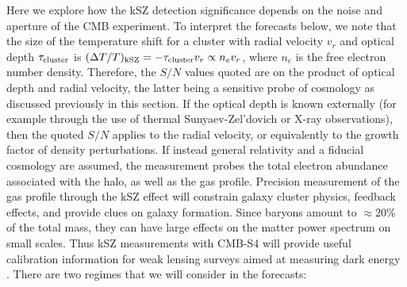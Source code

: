 Here we explore how the kSZ detection significance depends on the noise and aperture of the CMB experiment. 
To interpret the forecasts below, we note that the size of the temperature shift for a cluster with radial velocity $v_r$ and optical depth $\tau_{\rm cluster}$ is $(\Delta T/T)_{\rm kSZ} = - \tau_{\rm cluster} v_r \propto n_e v_r$, where $n_e$ is the free electron number density.  Therefore, the $S/N$ values quoted are on the product of optical depth and radial velocity, the latter being a sensitive probe of cosmology as discussed previously in this section.  If the optical depth is known externally (for example through the use of thermal Sunyaev-Zel'dovich or X-ray observations), then the quoted $S/N$ applies to the radial velocity, or equivalently to the growth factor of density perturbations.  If instead general relativity and a fiducial cosmology are assumed,
the measurement probes the total electron abundance associated with the halo, as well as the gas profile. Precision measurement of the gas profile through the kSZ effect will constrain galaxy cluster physics, feedback effects, and provide clues on galaxy formation. 
Since baryons amount to $\approx 20$\% of the total mass, they can have large effects on the matter power spectrum on small scales. Thus kSZ measurements with CMB-S4 will provide useful calibration information for weak lensing surveys aimed at measuring dark energy \cite{vanDaalen:2011xb, Mohammed:2014mba}.
There are two regimes that we will consider in the forecasts:

